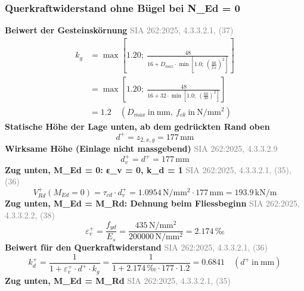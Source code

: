 \documentclass[11pt,a4paper]{article}
\newcommand{\normref}[1]{{\small\textcolor{gray}{#1}}}
\begin{document}
\subsubsection{Querkraftwiderstand ohne Bügel bei N\_Ed = 0}
\noindent\textbf{Beiwert der Gesteinskörnung} \hfill \normref{SIA 262:2025, 4.3.3.2.1, (37)}
\begin{equation*}
\begin{aligned}
  k_g &= \max\left[1.20;\ \frac{48}{16 + D_{max} \cdot \min\left[1.0;\ \left(\frac{60}{f_{ck}}\right)^{2}\right]}\right] \\
  &= \max\left[1.20;\ \frac{48}{16 + 32 \cdot \min\left[1.0;\ \left(\frac{60}{30}\right)^{2}\right]}\right] \\
  &= 1.2 \quad \left(D_{max}\ \text{in}\ \mathrm{mm},\ f_{ck}\ \text{in}\ \mathrm{N}/\mathrm{mm}^{2}\right)
\end{aligned}
\end{equation*}
\noindent\textbf{Statische Höhe der Lage unten, ab dem gedrückten Rand oben}
\begin{equation*}
d^{+} = z_{2,x,g} = 177\,\mathrm{mm}
\end{equation*}
\noindent\textbf{Wirksame Höhe (Einlage nicht massgebend)} \hfill \normref{SIA 262:2025, 4.3.3.2.9}
\begin{equation*}
d_v^{+} = d^{+} = 177\,\mathrm{mm}
\end{equation*}
\noindent\textbf{Zug unten, M\_Ed = 0: ε\_v = 0, k\_d = 1} \hfill \normref{SIA 262:2025, 4.3.3.2.1, (35), (36)}
\begin{equation*}
V_{Rd}^{+}(M_{Ed} = 0) = \tau_{cd} \cdot d_v^{+} = 1.0954\,\mathrm{N}/\mathrm{mm}^{2} \cdot 177\,\mathrm{mm} = 193.9\,\mathrm{kN}/\mathrm{m}
\end{equation*}
\noindent\textbf{Zug unten, M\_Ed = M\_Rd: Dehnung beim Fliessbeginn} \hfill \normref{SIA 262:2025, 4.3.3.2.2, (38)}
\begin{equation*}
\varepsilon_v^{+} = \frac{f_{yd}}{E_s} = \frac{435\,\mathrm{N}/\mathrm{mm}^{2}}{200000\,\mathrm{N}/\mathrm{mm}^{2}} = 2.174\,\text{‰}
\end{equation*}
\noindent\textbf{Beiwert für den Querkraftwiderstand} \hfill \normref{SIA 262:2025, 4.3.3.2.1, (36)}
\begin{equation*}
k_d^{+} = \frac{1}{1 + \varepsilon_v^{+} \cdot d^{+} \cdot k_g} = \frac{1}{1 + 2.174\,\text{‰} \cdot 177 \cdot 1.2} = 0.6841 \quad \left(d^{+}\ \text{in}\ \mathrm{mm}\right)
\end{equation*}
\noindent\textbf{Zug unten, M\_Ed = M\_Rd} \hfill \normref{SIA 262:2025, 4.3.3.2.1, (35)}
\end{document}
